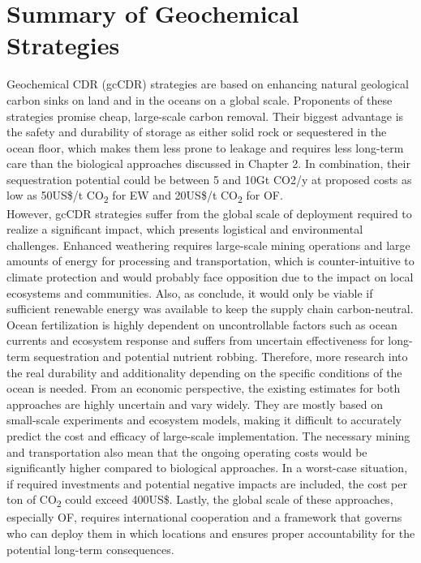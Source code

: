 \section{Summary of Geochemical Strategies}
Geochemical CDR (gcCDR) strategies are based on enhancing natural geological carbon sinks on land and in the oceans on a global scale. Proponents of these strategies promise cheap, large-scale carbon removal. Their biggest advantage is the safety and durability of storage as either solid rock or sequestered in the ocean floor, which makes them less prone to leakage and requires less long-term care than the biological approaches discussed in Chapter 2. In combination, their sequestration potential could be between 5 and 10Gt CO2/y at proposed costs as low as 50US\$/t CO\textsubscript{2} for EW and 20US\$/t CO\textsubscript{2} for OF.\\
However, gcCDR strategies suffer from the global scale of deployment required to realize a significant impact, which presents logistical and environmental challenges. Enhanced weathering requires large-scale mining operations and large amounts of energy for processing and transportation, which is counter-intuitive to climate protection and would probably face opposition due to the impact on local ecosystems and communities. Also, as \textcite{Goll2021PotentialRock} conclude, it would only be viable if sufficient renewable energy was available to keep the supply chain carbon-neutral.
Ocean fertilization is highly dependent on uncontrollable factors such as ocean currents and ecosystem response and suffers from uncertain effectiveness for long-term sequestration and potential nutrient robbing. Therefore, more research into the real durability and additionality depending on the specific conditions of the ocean is needed.
From an economic perspective, the existing estimates for both approaches are highly uncertain and vary widely. They are mostly based on small-scale experiments and ecosystem models, making it difficult to accurately predict the cost and efficacy of large-scale implementation. The necessary mining and transportation also mean that the ongoing operating costs would be significantly higher compared to biological approaches. In a worst-case situation, if required investments and potential negative impacts are included, the cost per ton of CO\textsubscript{2} could exceed 400US\$.
Lastly, the global scale of these approaches, especially OF, requires international cooperation and a framework that governs who can deploy them in which locations and ensures proper accountability for the potential long-term consequences.